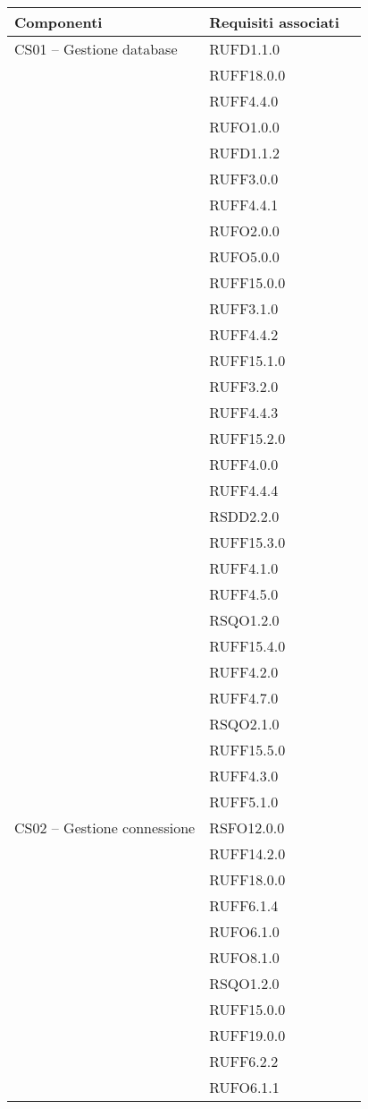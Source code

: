 \begin{center}
\begin{longtable}{lp{}l}
\toprule Componenti & Requisiti associati\\
\midrule
CS01 -- Gestione database & RUFD1.1.0 \\
 & RUFF18.0.0 \\
 & RUFF4.4.0 \\
 & RUFO1.0.0 \\
 & RUFD1.1.2 \\
 & RUFF3.0.0 \\
 & RUFF4.4.1 \\
 & RUFO2.0.0 \\
 & RUFO5.0.0 \\
 & RUFF15.0.0 \\
 & RUFF3.1.0 \\
 & RUFF4.4.2 \\
 & RUFF15.1.0 \\
 & RUFF3.2.0 \\
 & RUFF4.4.3 \\
 & RUFF15.2.0 \\
 & RUFF4.0.0 \\
 & RUFF4.4.4 \\
 & RSDD2.2.0 \\
 & RUFF15.3.0 \\
 & RUFF4.1.0 \\
 & RUFF4.5.0 \\
 & RSQO1.2.0 \\
 & RUFF15.4.0 \\
 & RUFF4.2.0 \\
 & RUFF4.7.0 \\
 & RSQO2.1.0 \\
 & RUFF15.5.0 \\
 & RUFF4.3.0 \\
 & RUFF5.1.0 \\
CS02 -- Gestione connessione & RSFO12.0.0 \\
 & RUFF14.2.0 \\
 & RUFF18.0.0 \\
 & RUFF6.1.4 \\
 & RUFO6.1.0 \\
 & RUFO8.1.0 \\
 & RSQO1.2.0 \\
 & RUFF15.0.0 \\
 & RUFF19.0.0 \\
 & RUFF6.2.2 \\
 & RUFO6.1.1 \\

\end{longtable}
\end{center}
